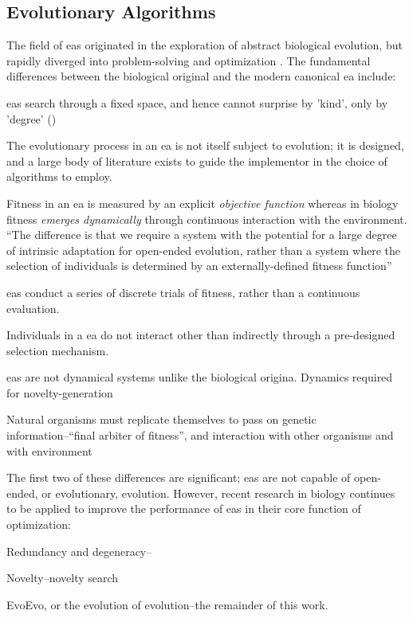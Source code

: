 \subsection{Evolutionary Algorithms}

The field of \glspl{ea} originated in the exploration of abstract biological evolution, but rapidly diverged into problem-solving and optimization \cite{De-Jong:1993gy,DeJong2006}. The fundamental differences between the biological original and the modern canonical \gls{ea} include:

\begin{compactitem}
\item \Glspl{ea} search through a fixed space, and hence cannot surprise by 'kind', only by 'degree' (\eg \parencite{Nellis2014})
\item The evolutionary process in an \gls{ea} is not itself subject to evolution; it is designed, and a large body of literature exists to guide the implementor in the choice of algorithms to employ.
\item Fitness in an \gls{ea} is measured by an explicit \emph{objective function} whereas in biology fitness \emph{emerges dynamically} through continuous interaction with the environment. ``The difference is that we require a system with the potential for a large degree of intrinsic adaptation for open-ended evolution, rather than a system where the selection of individuals is determined by an externally-defined fitness function'' \parencite{Taylor2001}
\item \Glspl{ea} conduct a series of discrete trials of fitness, rather than a continuous evaluation.
\item Individuals in a \gls{ea} do not interact other than indirectly through a pre-designed selection mechanism.
\item \Glspl{ea} are not dynamical systems unlike the biological origina. Dynamics required for novelty-generation \parencite{Nellis2012}
\item Natural organisms must replicate themselves to pass on genetic information--``final arbiter of fitness'', and interaction with other organisms and with environment \parencite{Ofria2004}
\end{compactitem}

The first two of these differences are significant; \glspl{ea} are not capable of open-ended, or evolutionary, evolution. However, recent research in biology continues to be applied to improve the performance of \glspl{ea} in their core function of optimization:
\begin{compactitem}
	\item Redundancy and degeneracy--\eg \parencite{Whitacre:2010qy}
	\item Novelty--\eg novelty search \parencite{Lehman:2008cr}
	\item EvoEvo, or the evolution of evolution--\eg the remainder of this work.
\end{compactitem}

